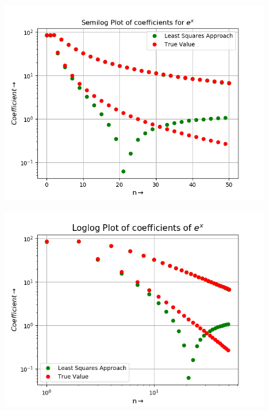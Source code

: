 \documentclass[11pt, a4paper]{article}
\begin{document}
\begin{figure}
\centering
\begin{minipage}{.5\textwidth}
  \centering
  \includegraphics[width=\linewidth]{fig7.png}
  \label{fig:test1}
\end{minipage}%
\begin{minipage}{.5\textwidth}
  \centering
  \includegraphics[width=\linewidth]{fig8.png}
  \label{fig:test2}
\end{minipage}
\end{figure}
\end{document}
